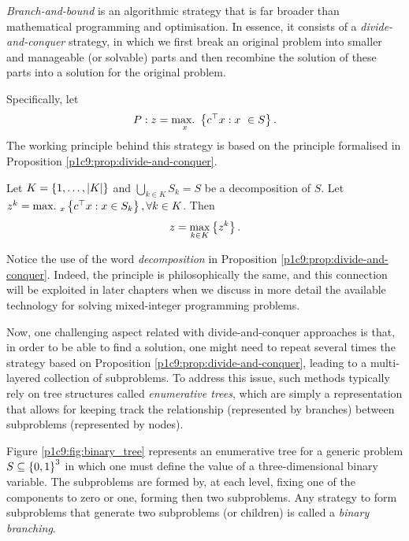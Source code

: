 \emph{Branch-and-bound} is an algorithmic strategy that is far broader than mathematical programming and optimisation. In essence, it consists of a \emph{divide-and-conquer} strategy, in which we first break an original problem into smaller and manageable (or solvable) parts and then recombine the solution of these parts into a solution for the original problem.

Specifically, let 
%
\begin{equation*}
	P: z = \mathop{\text{max.~}}_x \left\{ c^\top x : x\ \in S \right \}. 
\end{equation*}
%
The working principle behind this strategy is based on the principle formalised in Proposition \ref{p1c9:prop:divide-and-conquer}.

\begin{proposition} \label{p1c9:prop:divide-and-conquer}
    Let $K = \left\{ 1,\dots,|K| \right \}$ and  $\bigcup_{k \in K} S_k = S$ be a decomposition of $S$. Let $z^k = \mathop{\text{max.~}}_x\left\{ c^\top x : x \in  S_k \right \}, \forall k \in K$. Then 
    \begin{equation*}
    	z = \max_{k \in K} \left\{ z^k \right \}.	
    \end{equation*}
\end{proposition}

Notice the use of the word \emph{decomposition} in Proposition \ref{p1c9:prop:divide-and-conquer}. Indeed, the principle is philosophically the same, and this connection will be exploited in later chapters when we discuss in more detail the available technology for solving mixed-integer programming problems.

Now, one challenging aspect related with divide-and-conquer approaches is that, in order to be able to find a solution, one might need to repeat several times the strategy based on Proposition \ref{p1c9:prop:divide-and-conquer}, leading to a multi-layered collection of subproblems. To address this issue, such methods typically rely on tree structures called \emph{enumerative trees}, which are simply a representation that allows for keeping track the relationship (represented by branches) between subproblems (represented by nodes).

Figure \ref{p1c9:fig:binary_tree} represents an enumerative tree for a generic problem $S \subseteq \left\{ 0,1 \right \}^3$ in which one must define the value of a three-dimensional binary variable. The subproblems are formed by, at each level, fixing one of the components to zero or one, forming then two subproblems. Any strategy to form subproblems that generate two subproblems (or children) is called a \emph{binary branching}.

